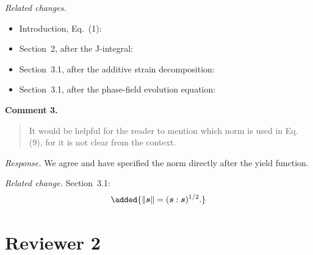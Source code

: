 \documentclass[a4paper,11pt]{article}
\newenvironment{ReviewerComment}{\begin{quote}\small}{\end{quote}}
\begin{document}
\emph{Related changes.}
\begin{itemize}
  \item Introduction, Eq.~(1): 
  \item Section~2, after the J-integral: 
  \item Section~3.1, after the additive strain decomposition:
  \item Section~3.1, after the phase-field evolution equation:
\end{itemize}

\textbf{Comment 3.}
\begin{ReviewerComment}
It would be helpful for the reader to mention which norm is used in
Eq. (9), for it is not clear from the context.
\end{ReviewerComment}

\emph{Response.} We agree and have specified the norm directly after
the yield function.

\emph{Related change.} Section~3.1:
\[
\added{\|\boldsymbol{s}\|=(\boldsymbol{s}:\boldsymbol{s})^{1/2}.}
\]

\section*{Reviewer 2}
\end{document}
